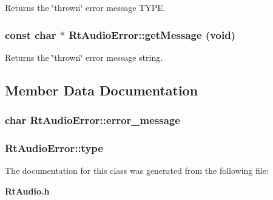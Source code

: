 Returns the \char`\"{}thrown\char`\"{} error message TYPE.

\subsubsection{\setlength{\rightskip}{0pt plus 5cm}const char $\ast$ Rt\-Audio\-Error::get\-Message (void)\hspace{0.3cm}{\tt  [inline, virtual]}}\label{classRtAudioError_a4}


Returns the \char`\"{}thrown\char`\"{} error message string.



\subsection{Member Data Documentation}
\subsubsection{\setlength{\rightskip}{0pt plus 5cm}char Rt\-Audio\-Error::error\_\-message\hspace{0.3cm}{\tt  [protected]}}\label{classRtAudioError_n0}


\subsubsection{ Rt\-Audio\-Error::type\hspace{0.3cm}{\tt  [protected]}}\label{classRtAudioError_n1}




The documentation for this class was generated from the following file:\begin{CompactItemize}
\item 
{\bf Rt\-Audio.h}\end{CompactItemize}
